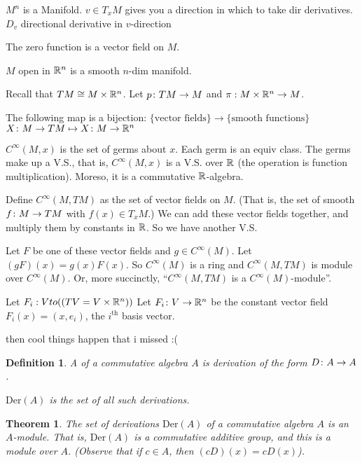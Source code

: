 \documentclass[11pt]{amsbook}
\theoremstyle{mystyle} %
\newtheorem{thrm}[thm]{Theorem}
\newtheorem{defi}[thm]{Definition}
\numberwithin{thm}{section}
\newcommand{\x}{\times}
\newcommand{\Der}{\text{Der}}
\begin{document}
$M^n$ is a Manifold.
$v \in T_xM$ gives you a direction in which to take dir derivatives.
$D_v$ directional derivative in $v$-direction


\begin{example}
	The zero function is a vector field on $M$.
\end{example}
\begin{example}
	$M$ open in ${\mathbb R}^n$ is a smooth $n$-dim manifold.

	Recall that $TM \mathrel{\cong}   M \times {\mathbb R}^n$.  Let $p\colon TM \to M$ and $\pi:M \times {\mathbb R}^n \to M$.

	The following map is a bijection:
	$\{\text{vector fields}\} \to \{\text{smooth functions}\}$
	$        X\colon M \to TM      \mapsto     X\colon M \to {\mathbb R}^n$
\end{example}
\begin{example}
	$C^\infty(M,x)$ is the set of germs about $x$.
	Each germ is an equiv class.
	The germs make up a V.S., that is, $C^\infty(M,x)$ is a V.S. over ${\mathbb R}$ (the operation is function multiplication).  Moreso, it is a commutative ${\mathbb R}$-algebra.

	Define $C^\infty(M, TM)$ as the set of vector fields on $M$.  (That is, the set of smooth $f\colon M \to TM$ with $f(x) \in T_xM$.)  We can add these vector fields together, and multiply them by constants in ${\mathbb R}$.  So we have another V.S.

	Let $F$ be one of these vector fields and $g \in C^\infty(M)$.
	Let $(gF)(x) = g(x)F(x)$.
	So $C^\infty(M)$ is a ring and $C^\infty(M, TM)$ is module over $C^\infty(M)$.  Or, more succinctly, ``$C^\infty(M, TM)$ is a $C^\infty(M)$-module''.

	Let $F_i : V to ((TV = V \x \R^n))$
	Let $F_i \colon V \to {\mathbb R}^n$ be the constant vector field $F_i(x) = (x,e_i)$, the $i^\text{th}$ basis vector.

	then cool things happen that i missed :(
\end{example}
\begin{defi}
	A  of a commutative algebra $A$ is derivation of the form $D\colon A \to A$.

	$\Der(A)$ is the set of all such derivations.
\end{defi}
\begin{thrm}
	The set of derivations $\Der(A)$ of a commutative algebra $A$ is an $A$-module.  That is, $\Der(A)$ is a commutative additive group, and this is a module over $A$.  (Observe that if $c \in A$, then $(cD)(x) = cD(x)$).
\end{thrm}
\end{document}
